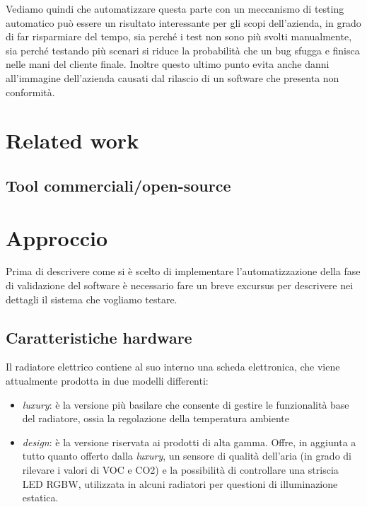 \documentclass[12pt,a4paper,twoside,titlepage]{book}
\begin{document}
Vediamo quindi che automatizzare questa parte con un meccanismo di testing automatico
può essere un risultato interessante per gli scopi dell'azienda, in grado di far
risparmiare del tempo, sia perché i test non sono più svolti manualmente, sia perché
testando più scenari si riduce la probabilità che un bug sfugga e finisca nelle mani
del cliente finale. Inoltre questo ultimo punto evita anche danni all'immagine dell'azienda
causati dal rilascio di un software che presenta non conformità.

\chapter{Related work}
\section{Tool commerciali/open-source}


\chapter{Approccio}

Prima di descrivere come si è scelto di implementare l'automatizzazione della fase
di validazione del software è necessario fare un breve excursus per descrivere nei
dettagli il sistema che vogliamo testare.

\section{Caratteristiche hardware}

Il radiatore elettrico contiene al suo interno una scheda elettronica, che viene
attualmente prodotta in due modelli differenti:
\begin{itemize}
    \item \textit{luxury}: è la versione più basilare che consente di gestire le
        funzionalità base del radiatore, ossia la regolazione della temperatura ambiente
    \item \textit{design}: è la versione riservata ai prodotti di alta gamma. Offre, in
        aggiunta a tutto quanto offerto dalla \textit{luxury}, un sensore di qualità
        dell'aria (in grado di rilevare i valori di VOC e CO2) e la possibilità di
        controllare una striscia LED RGBW, utilizzata in alcuni radiatori per questioni
        di illuminazione estatica.
\end{itemize}
\end{document}
